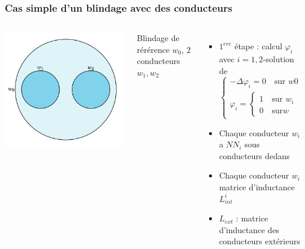 \begin{frame}
\frametitle{Cas simple d'un blindage avec des conducteurs}
\begin{columns}[T]
\begin{center}
\includegraphics[scale=0.2]{figures/f3}
\end{center}
Blindage de r\'er\'erence $w_0$, $2$ conducteurs $w_1, w_2$
\begin{itemize}
\item $1^{ere}$ \'etape : calcul $\varphi_i$ avec $i=1,2$-solution de
 \begin{equation}
 \begin{cases}
 -\Delta\varphi_i = 0 \quad \text{sur } w0 \\
 \varphi_i =  
 \begin{cases}
 1 \quad \text{sur } w_i \\
 0 \quad \text{sur} w
 \end{cases}
 \end{cases}
 \end{equation}
\item Chaque conducteur $w_i$ a $NN_i$ sous conducteurs dedans
\item Chaque conducteur $w_i$ matrice d'inductance $L_{int}^i$
\item $L_{ext}$ : matrice d'inductance des conducteurs ext\'erieurs  
\end{itemize}
\end{columns}
\end{frame} 

